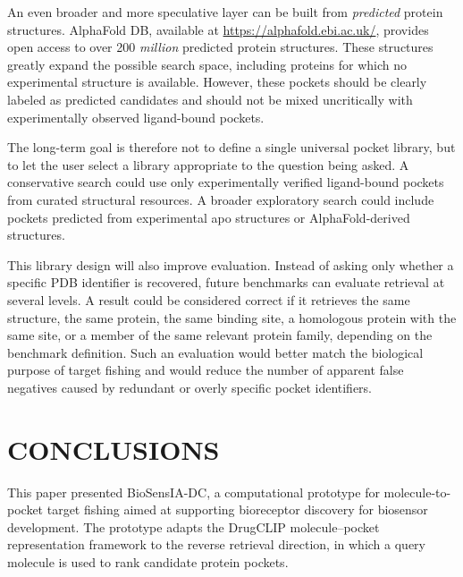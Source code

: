 \documentclass[12pt,fleqn]{article}
\begin{document}
An even broader and more speculative layer can be built from
\emph{predicted} protein structures. AlphaFold DB, available at
\url{https://alphafold.ebi.ac.uk/}, provides open access to over 200
\emph{million} predicted protein structures. These structures greatly expand
the possible search space, including proteins for which no
experimental structure is available. However, these pockets should be
clearly labeled as predicted candidates and should not be mixed
uncritically with experimentally observed ligand-bound pockets.

The long-term goal is therefore not to define a single universal
pocket library, but to let the user select a library appropriate to
the question being asked. A conservative search could use only
experimentally verified ligand-bound pockets from curated structural
resources. A broader exploratory search could include pockets
predicted from experimental apo structures or AlphaFold-derived
structures.

This library design will also improve evaluation. Instead of asking
only whether a specific PDB identifier is recovered, future benchmarks
can evaluate retrieval at several levels. A result could be considered
correct if it retrieves the same structure, the same protein, the same
binding site, a homologous protein with the same site, or a member of
the same relevant protein family, depending on the benchmark
definition. Such an evaluation would better match the biological
purpose of target fishing and would reduce the number of apparent
false negatives caused by redundant or overly specific pocket
identifiers.


\section{CONCLUSIONS}

This paper presented BioSensIA-DC, a computational prototype for
molecule-to-pocket target fishing aimed at supporting bioreceptor
discovery for biosensor development. The prototype adapts the DrugCLIP
molecule--pocket representation framework to the reverse retrieval
direction, in which a query molecule is used to rank candidate protein
pockets.
\end{document}

